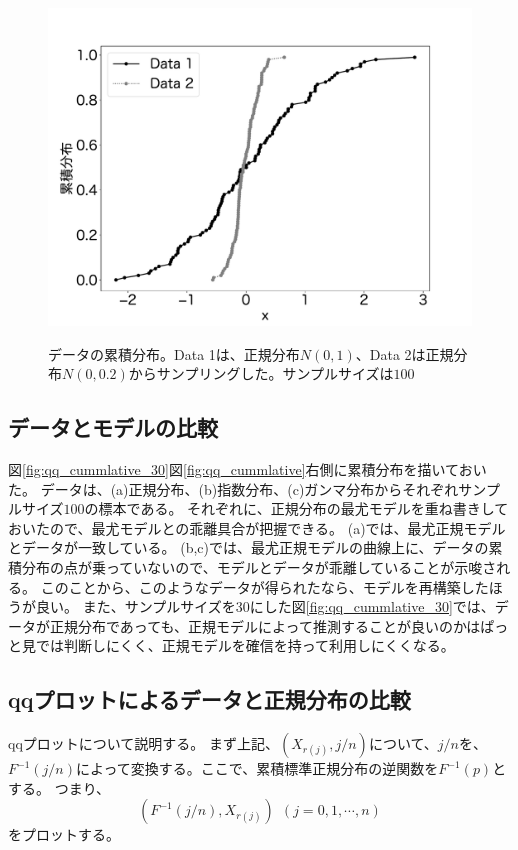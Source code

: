 \begin{figure}
 \begin{center}
  \includegraphics[width=15cm]{./image/12_/cummlative_data_example_norm.pdf}
  \label{fig:qq_ccummlative_data_example_normummlative}
  \caption{データの累積分布。Data 1は、正規分布$N(0,1)$、Data 2は正規分布$N(0,0.2)$からサンプリングした。サンプルサイズは$100$}
 \end{center}
\end{figure}


\subsection{データとモデルの比較}
図\ref{fig:qq_cummlative_30}図\ref{fig:qq_cummlative}右側に累積分布を描いておいた。
データは、(a)正規分布、(b)指数分布、(c)ガンマ分布からそれぞれサンプルサイズ$100$の標本である。
それぞれに、正規分布の最尤モデルを重ね書きしておいたので、最尤モデルとの乖離具合が把握できる。
(a)では、最尤正規モデルとデータが一致している。
(b,c)では、最尤正規モデルの曲線上に、データの累積分布の点が乗っていないので、モデルとデータが乖離していることが示唆される。
このことから、このようなデータが得られたなら、モデルを再構築したほうが良い。
また、サンプルサイズを30にした図\ref{fig:qq_cummlative_30}では、データが正規分布であっても、正規モデルによって推測することが良いのかはぱっと見では判断しにくく、正規モデルを確信を持って利用しにくくなる。

\subsection{qqプロットによるデータと正規分布の比較}
qqプロットについて説明する。
まず上記、$(X_{r(j)},j/n)$について、$j/n$を、$F^{-1}(j/n)$によって変換する。ここで、累積標準正規分布の逆関数を$F^{-1}(p)$とする。
つまり、
\begin{equation*}
(F^{-1}(j/n),X_{r(j)}) \ \ (j=0,1,\cdots,n)
\end{equation*}
をプロットする。



